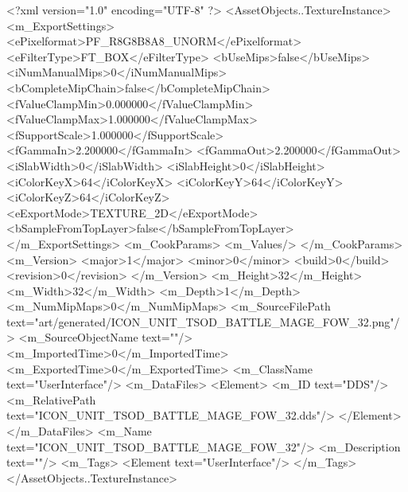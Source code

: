 <?xml version="1.0" encoding="UTF-8" ?>
<AssetObjects..TextureInstance>
	<m_ExportSettings>
		<ePixelformat>PF_R8G8B8A8_UNORM</ePixelformat>
		<eFilterType>FT_BOX</eFilterType>
		<bUseMips>false</bUseMips>
		<iNumManualMips>0</iNumManualMips>
		<bCompleteMipChain>false</bCompleteMipChain>
		<fValueClampMin>0.000000</fValueClampMin>
		<fValueClampMax>1.000000</fValueClampMax>
		<fSupportScale>1.000000</fSupportScale>
		<fGammaIn>2.200000</fGammaIn>
		<fGammaOut>2.200000</fGammaOut>
		<iSlabWidth>0</iSlabWidth>
		<iSlabHeight>0</iSlabHeight>
		<iColorKeyX>64</iColorKeyX>
		<iColorKeyY>64</iColorKeyY>
		<iColorKeyZ>64</iColorKeyZ>
		<eExportMode>TEXTURE_2D</eExportMode>
		<bSampleFromTopLayer>false</bSampleFromTopLayer>
	</m_ExportSettings>
	<m_CookParams>
		<m_Values/>
	</m_CookParams>
	<m_Version>
		<major>1</major>
		<minor>0</minor>
		<build>0</build>
		<revision>0</revision>
	</m_Version>
	<m_Height>32</m_Height>
	<m_Width>32</m_Width>
	<m_Depth>1</m_Depth>
	<m_NumMipMaps>0</m_NumMipMaps>
	<m_SourceFilePath text="art/generated/ICON_UNIT_TSOD_BATTLE_MAGE_FOW_32.png"/>
	<m_SourceObjectName text=""/>
	<m_ImportedTime>0</m_ImportedTime>
	<m_ExportedTime>0</m_ExportedTime>
	<m_ClassName text="UserInterface"/>
	<m_DataFiles>
		<Element>
			<m_ID text="DDS"/>
			<m_RelativePath text="ICON_UNIT_TSOD_BATTLE_MAGE_FOW_32.dds"/>
		</Element>
	</m_DataFiles>
	<m_Name text="ICON_UNIT_TSOD_BATTLE_MAGE_FOW_32"/>
	<m_Description text=""/>
	<m_Tags>
		<Element text="UserInterface"/>
	</m_Tags>
</AssetObjects..TextureInstance>
